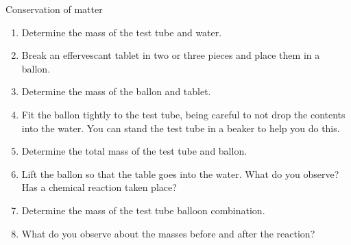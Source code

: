\begin{i_experiment}{Conservation of matter}
\begin{minipage}{.7\textwidth}
\begin{enumerate}[noitemsep, label=\textbf{\arabic*}. ]
\item Determine the mass of the test tube and water.
\item Break an effervescant tablet in two or three pieces and place them in a ballon.
\item Determine the mass of the ballon and tablet.
\item Fit the ballon tightly to the test tube, being careful to not drop the contents into the water. You can stand the test tube in a beaker to help you do this.
\item Determine the total mass of the test tube and ballon.
\item Lift the ballon so that the table goes into the water. What do you observe? Has a chemical reaction taken place?
\item Determine the mass of the test tube balloon combination.
\item What do you observe about the masses before and after the reaction?
\end{enumerate}
\end{minipage}
\begin{minipage}{.3\textwidth}
 \begin{center}
\end{center}
\end{minipage}
\end{i_experiment}
